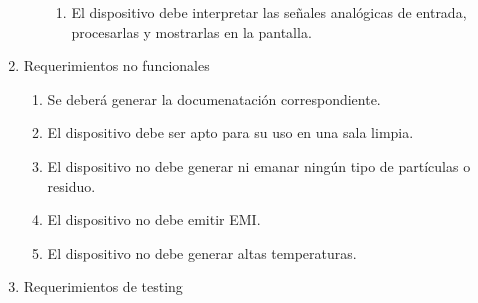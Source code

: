 \documentclass[
11pt, %
codirector, %
]{charter}
\begin{document}
\begin{enumerate}
\begin{enumerate}
\begin{enumerate}
					\item El dispositivo debe interpretar las señales analógicas de entrada, procesarlas y mostrarlas en la pantalla.
				\end{enumerate}
		\end{enumerate}
	\item Requerimientos no funcionales
		\begin{enumerate}
			\item Se deberá generar la documenatación correspondiente.
			\item El dispositivo debe ser apto para su uso en una sala limpia.
			\item El dispositivo no debe generar ni emanar ningún tipo de partículas o residuo.
			\item El dispositivo no debe emitir EMI.
			\item El dispositivo no debe generar altas temperaturas.
		\end{enumerate}
	\item Requerimientos de testing

\end{enumerate}
\end{document}
